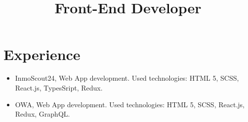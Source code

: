 \documentclass[11pt,a4paper]{moderncv}
\title{Front-End Developer}
\begin{document}
    \maketitle
    \section{Experience}

    {\begin{itemize}
         \item InmoScout24, Web App development. Used technologies: HTML 5, SCSS, React.js, TypesSript, Redux.
    \end{itemize}
    }
    {\begin{itemize}
         \item OWA, Web App development. Used technologies: HTML 5, SCSS, React.js, Redux, GraphQL.
    \end{itemize}
    }
\end{document}
